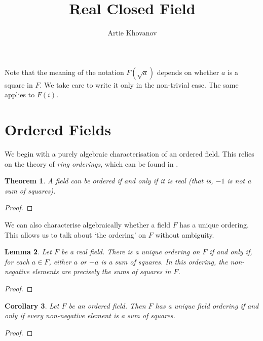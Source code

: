 \documentclass[a4paper]{report}
\title{Real Closed Field}
\author{Artie Khovanov}
\newtheorem{theorem}{Theorem}
\newtheorem{lemma}[theorem]{Lemma}
\newtheorem{corollary}[theorem]{Corollary}
\theoremstyle{definition}
\begin{document}
\maketitle

Note that the meaning of the notation $F(\sqrt{a})$ depends on whether $a$ is a square in $F$. We take care to write it only in the non-trivial case. The same applies to $F(i)$.

\section{Ordered Fields} 

We begin with a purely algebraic characterisation of an ordered field. This relies on the theory of \textit{ring orderings}, which can be found in \cite{Lam1984}.

\begin{theorem}
  \label{thm:ord_iff_real}
  \leanok
  A field can be ordered if and only if it is real (that is, $-1$ is not a sum of squares).
\end{theorem}
\begin{proof}
  \leanok
\end{proof}

We can also characterise algebraically whether a field $F$ has a unique ordering. This allows us to talk about `the ordering' on $F$ without ambiguity.

\begin{lemma}
  \label{lem:unique_ord_cond}
  \leanok
  Let $F$ be a real field. There is a unique ordering on $F$ if and only if, for each $a\in F$, either $a$ or $-a$ is a sum of squares. In this ordering, the non-negative elements are precisely the sums of squares in $F$.
\end{lemma}
\begin{proof}
  \leanok
\end{proof}

\begin{corollary}
  \label{cor:unique_ord_cond_ordered}
  \leanok
  Let $F$ be an ordered field. Then $F$ has a unique field ordering if and only if every non-negative element is a sum of squares.
\end{corollary}
\begin{proof}
  \leanok
\end{proof}
\end{document}
